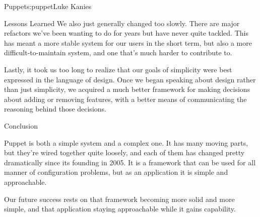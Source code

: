 \begin{aosachapter}{Puppet}{s:puppet}{Luke Kanies}
\begin{aosasect1}{Lessons Learned}
We also just generally changed too slowly.  There are major refactors
we've been wanting to do for years but have never quite tackled.  This
has meant a more stable system for our users in the short term, but
also a more difficult-to-maintain system, and one that's much harder
to contribute to.

Lastly, it took us too long to realize that our goals of simplicity
were best expressed in the language of design.  Once we began speaking
about design rather than just simplicity, 
we acquired a much better framework for making decisions about adding
or removing features, with a better means of communicating the
reasoning behind those decisions.

\end{aosasect1}

\begin{aosasect1}{Conclusion}

Puppet is both a simple system and a complex one.  It has many moving
parts, but they're wired together quite loosely, and each of them has
changed pretty dramatically since its founding in 2005.  It is a
framework that can be used for all manner of configuration problems,
but as an application it is simple and approachable.

Our future success rests on that framework becoming more solid and
more simple, and that application staying approachable while it gains
capability.

\end{aosasect1}

\end{aosachapter}
